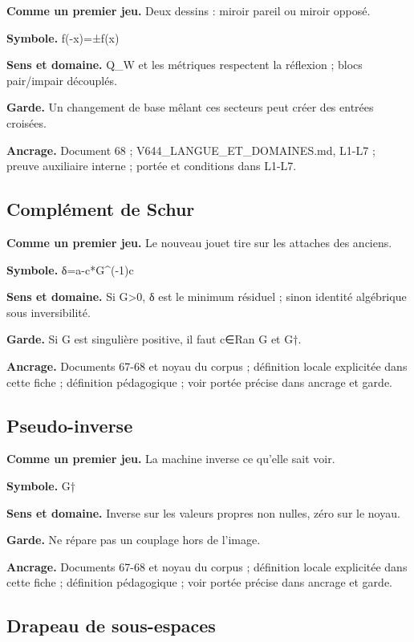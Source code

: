 \documentclass[
  9pt,
  a4paper,
]{article}
\begin{document}
\textbf{Comme un premier jeu.} Deux dessins : miroir pareil ou miroir
opposé.

\textbf{Symbole.} f(-x)=±f(x)

\textbf{Sens et domaine.} Q\_W et les métriques respectent la réflexion
; blocs pair/impair découplés.

\textbf{Garde.} Un changement de base mêlant ces secteurs peut créer des
entrées croisées.

\textbf{Ancrage.} Document 68 ; V644\_LANGUE\_ET\_DOMAINES.md, L1-L7 ;
preuve auxiliaire interne ; portée et conditions dans L1-L7.

\hypertarget{compluxe9ment-de-schur}{%
\subsection{Complément de Schur}\label{compluxe9ment-de-schur}}

\textbf{Comme un premier jeu.} Le nouveau jouet tire sur les attaches
des anciens.

\textbf{Symbole.} δ=a-c*G\^{}(-1)c

\textbf{Sens et domaine.} Si G\textgreater0, δ est le minimum résiduel ;
sinon identité algébrique sous inversibilité.

\textbf{Garde.} Si G est singulière positive, il faut c∈Ran G et G†.

\textbf{Ancrage.} Documents 67-68 et noyau du corpus ; définition locale
explicitée dans cette fiche ; définition pédagogique ; voir portée
précise dans ancrage et garde.

\hypertarget{pseudo-inverse}{%
\subsection{Pseudo-inverse}\label{pseudo-inverse}}

\textbf{Comme un premier jeu.} La machine inverse ce qu'elle sait voir.

\textbf{Symbole.} G†

\textbf{Sens et domaine.} Inverse sur les valeurs propres non nulles,
zéro sur le noyau.

\textbf{Garde.} Ne répare pas un couplage hors de l'image.

\textbf{Ancrage.} Documents 67-68 et noyau du corpus ; définition locale
explicitée dans cette fiche ; définition pédagogique ; voir portée
précise dans ancrage et garde.

\hypertarget{drapeau-de-sous-espaces}{%
\subsection{Drapeau de sous-espaces}\label{drapeau-de-sous-espaces}}
\end{document}
